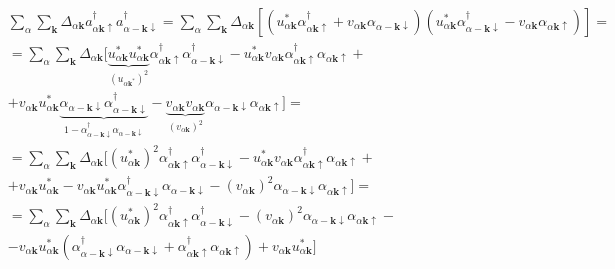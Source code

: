 \documentclass[class=article, crop=false]{standalone}
\begin{document}
\begin{equation}\label{key}
	\begin{split}
		& \sum_{ \alpha} \sum_{ \mathbf{k}} \Delta_{ \alpha \mathbf{k}} a^{ \dagger}_{ \alpha \mathbf{k} \uparrow} a^{ \dagger}_{ \alpha -\mathbf{k} \downarrow} = 
		\sum_{ \alpha} \sum_{ \mathbf{k}} \Delta_{ \alpha \mathbf{k}} 
		[ (u_{ \alpha \mathbf{k}}^{ \ast} \alpha_{ \alpha \mathbf{k} \uparrow}^{ \dagger} + v_{ \alpha \mathbf{k}} \alpha_{ \alpha - \mathbf{k} \downarrow}) (u_{ \alpha \mathbf{k}}^{ \ast} \alpha_{ \alpha - \mathbf{k} \downarrow}^{ \dagger} - v_{ \alpha \mathbf{k}} \alpha_{ \alpha \mathbf{k} \uparrow})] = \\
		& = \sum_{ \alpha} \sum_{ \mathbf{k}} \Delta_{ \alpha \mathbf{k}} [ \underbrace{u_{ \alpha \mathbf{k}}^{ \ast} u_{ \alpha \mathbf{k}}^{ \ast}}_{ \left( u_{ \alpha \mathbf{k}^{ \ast}} \right)^{2}} \alpha_{ \alpha \mathbf{k} \uparrow}^{ \dagger} \alpha_{ \alpha - \mathbf{k} \downarrow}^{ \dagger}
		- u_{ \alpha \mathbf{k}}^{ \ast} v_{ \alpha \mathbf{k}} \alpha_{ \alpha \mathbf{k} \uparrow}^{ \dagger} \alpha_{ \alpha \mathbf{k} \uparrow} + \\
		& + v_{ \alpha \mathbf{k}} u_{ \alpha \mathbf{k}}^{ \ast} \underbrace{\alpha_{ \alpha - \mathbf{k} \downarrow} \alpha_{ \alpha - \mathbf{k} \downarrow}^{ \dagger}}_{1 - \alpha_{ \alpha - \mathbf{k} \downarrow}^{ \dagger} \alpha_{ \alpha - \mathbf{k} \downarrow}}
		- \underbrace{v_{ \alpha \mathbf{k}} v_{ \alpha \mathbf{k}}}_{ \left( v_{ \alpha \mathbf{k}} \right)^{2}} \alpha_{ \alpha - \mathbf{k} \downarrow} \alpha_{ \alpha \mathbf{k} \uparrow}] = \\
		& = \sum_{ \alpha} \sum_{ \mathbf{k}} \Delta_{ \alpha \mathbf{k}} [ \left( u_{ \alpha \mathbf{k}}^{ \ast} \right)^{2} \alpha_{ \alpha \mathbf{k} \uparrow}^{ \dagger} \alpha_{ \alpha - \mathbf{k} \downarrow}^{ \dagger}
		- u_{ \alpha \mathbf{k}}^{ \ast} v_{ \alpha \mathbf{k}} \alpha_{ \alpha \mathbf{k} \uparrow}^{ \dagger} \alpha_{ \alpha \mathbf{k} \uparrow} + \\
		& + v_{ \alpha \mathbf{k}} u_{ \alpha \mathbf{k}}^{ \ast} - v_{ \alpha \mathbf{k}} u_{ \alpha \mathbf{k}}^{ \ast} \alpha_{ \alpha - \mathbf{k} \downarrow}^{ \dagger} \alpha_{ \alpha - \mathbf{k} \downarrow}
		- \left( v_{ \alpha \mathbf{k}} \right)^{2} \alpha_{ \alpha - \mathbf{k} \downarrow} \alpha_{ \alpha \mathbf{k} \uparrow} ] = \\
		& = \sum_{ \alpha} \sum_{ \mathbf{k}} \Delta_{ \alpha \mathbf{k}} [ \left( u_{ \alpha \mathbf{k}}^{ \ast} \right)^{2} \alpha_{ \alpha \mathbf{k} \uparrow}^{ \dagger} \alpha_{ \alpha - \mathbf{k} \downarrow}^{ \dagger} - \left( v_{ \alpha \mathbf{k}} \right)^{2} \alpha_{ \alpha - \mathbf{k} \downarrow} \alpha_{ \alpha \mathbf{k} \uparrow} - \\
		& - v_{ \alpha \mathbf{k}} u_{ \alpha \mathbf{k}}^{ \ast} \left( \alpha_{ \alpha - \mathbf{k} \downarrow}^{ \dagger} \alpha_{ \alpha - \mathbf{k} \downarrow} + \alpha_{ \alpha \mathbf{k} \uparrow}^{ \dagger} \alpha_{ \alpha \mathbf{k} \uparrow} \right) + v_{ \alpha \mathbf{k}} u_{ \alpha \mathbf{k}}^{ \ast} ]
	\end{split}
\end{equation}
\end{document}
